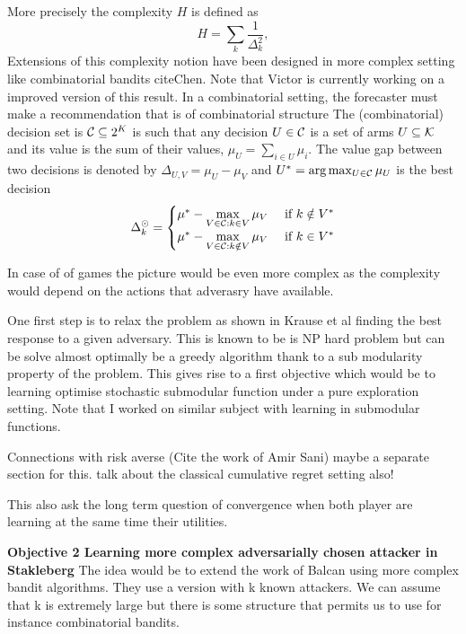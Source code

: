  More precisely the complexity $H$ is  defined as
%
\begin{equation}
H = \sum_{k} \frac{1}{\Delta_k^2},
\end{equation}
%
Extensions of this complexity notion have been designed in more complex setting like combinatorial bandits cite{Chen}. Note that Victor is currently working on a improved version of this result. In a combinatorial setting, the forecaster must make a recommendation that is of combinatorial structure
 The (combinatorial) decision set is ${\mathcal{C}}\subseteq 2^K$ is such that any decision $U \in {\mathcal{C}}$ is a set of arms $U\subseteq {\mathcal{K}}$ and its value is the sum of their values, $\mu_U = \sum_{i \in U} \mu_i$. The value gap between two decisions is denoted by $\Delta_{U,V} = \mu_U - \mu_V$ and $U^* = \arg\max_{U\in{\mathcal{C}}} \mu_U$ is the best decision 
 \begin{align*}
\Delta^\odot_k = 
\begin{cases} 
\mu^* - \max\limits_{V\in{\mathcal{C}}: k\in V} \mu_V & \text{ if } k\notin V^* \\
\mu^* - \max\limits_{V\in{\mathcal{C}}: k\notin V} \mu_V & \text{ if } k\in V^* \\
\end{cases}
\end{align*}

In case of of games the picture would be even more complex as the complexity would depend on the actions that adverasry have available.

One first step is to relax the problem as shown in Krause et al finding the best response to a given adversary. This is known to be is NP hard problem  but can be solve almost optimally be a greedy algorithm thank to a sub modularity property of the problem. This gives rise to a first objective which would be to learning optimise stochastic submodular function under a pure exploration setting.
Note that I worked on similar subject with learning in submodular functions.

Connections with risk averse (Cite the work of Amir Sani) maybe a separate section for this.
talk about the classical cumulative regret setting also!

This also ask the long term question of convergence when both player are learning at the same time their utilities.

\textbf{Objective 2 Learning  more complex adversarially chosen attacker in  Stakleberg}
The idea would be to  extend the work of Balcan using more complex bandit algorithms. They use a version with k known attackers. We can assume that k is extremely large but there is some  structure that permits us to use for instance combinatorial bandits.



